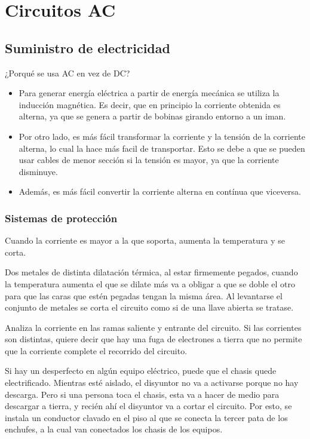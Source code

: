\documentclass[a5paper,12pt,twoside]{book}
\begin{document}
\chapter{Circuitos AC}


\section{Suministro de electricidad}

¿Porqué se usa AC en vez de DC?

\begin{itemize}
\item Para generar energía eléctrica a partir de energía mecánica se utiliza la inducción magnética. Es decir, que en principio la corriente obtenida es alterna, ya que se genera a partir de bobinas girando entorno a un iman.

\item Por otro lado, es más fácil transformar la corriente y la tensión de la corriente alterna, lo cual la hace más facil de transportar. Esto se debe a que se pueden usar cables de menor sección si la tensión es mayor, ya que la corriente disminuye.

\item Además, es más fácil convertir la corriente alterna en contínua que viceversa.
\end{itemize}


\subsection*{Sistemas de protección}

 Cuando la corriente es mayor a la que soporta, aumenta la temperatura y se corta.

 Dos metales de distinta dilatación térmica, al estar firmemente pegados, cuando la temperatura aumenta el que se dilate más va a obligar a que se doble el otro para que las caras que estén pegadas tengan la misma área. Al levantarse el conjunto de metales se corta el circuito como si de una llave abierta se tratase.

 Analiza la corriente en las ramas saliente y entrante del circuito. Si las corrientes son distintas, quiere decir que hay una fuga de electrones a tierra que no permite que la corriente complete el recorrido del circuito.

 Si hay un desperfecto en algún equipo eléctrico, puede que el chasis quede electrificado. Mientras esté aislado, el disyuntor no va a activarse porque no hay descarga. Pero si una persona toca el chasis, esta va a hacer de medio para descargar a tierra, y recién ahí el disyuntor va a cortar el circuito. Por esto, se instala un conductor clavado en el piso al que se conecta la tercer pata de los enchufes, a la cual van conectados los chasis de los equipos.
\end{document}
